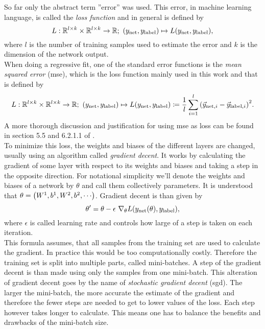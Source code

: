 So far only the abstract term ''error'' was used. This error, in machine learning language, is called the \emph{loss function} and in general is defined by
\begin{equation}\label{def:general_loss}
L:\mathbb{R}^{l\times k}\times\mathbb{R}^{l\times k}\to\mathbb{R};\ (y_\text{net}, y_\text{label})\mapsto L(y_\text{net}, y_\text{label}),
\end{equation}
where $l$ is the number of training samples used to estimate the error and $k$ is the dimension of the network output.\\
When doing a regressive fit, one of the standard error functions is the \emph{mean squared error} (\gls{mse}), which is the loss function mainly used in this work and that is defined by
\begin{equation}\label{def:loss_mean_squared_error}
L:\mathbb{R}^{l\times k}\times\mathbb{R}^{l\times k}\to\mathbb{R};\ (y_\text{net}, y_\text{label})\mapsto L(y_\text{net}, y_\text{label})\coloneqq\frac{1}{l}\sum_{i=1}^l{(\vec{y}_{\text{net},i}-\vec{y}_{\text{label},i})}^2.
\end{equation}
A more thorough discussion and justification for using \gls{mse} as loss can be found in section 5.5 and 6.2.1.1 of \cite{deep_learning_book}.\\
To minimize this loss, the weights and biases of the different layers are changed, usually using an algorithm called \emph{gradient decent}. It works by calculating the gradient of some layer with respect to its weights and biases and taking a step in the opposite direction. For notational simplicity we'll denote the weights and biases of a network by $\theta$ and call them collectively parameters. It is understood that $\theta=\lr{W^{1},b^1, W^2, b^2, \cdots}$. Gradient decent is than given by
\begin{equation}\label{def:gradient_decent}
\theta '=\theta - \epsilon\ \nabla_\theta L{\left( y_\text{net}(\theta), y_\text{label} \right)},
\end{equation}
where $\epsilon$ is called learning rate and controls how large of a step is taken on each iteration.\\
This formula assumes, that all samples from the training set are used to calculate the gradient. In practice this would be too computationally costly. Therefore the training set is split into multiple parts, called mini-batches. A step of the gradient decent is than made using only the samples from one mini-batch. This alteration of gradient decent goes by the name of \emph{stochastic gradient decent} (\gls{sgd}). The larger the mini-batch, the more accurate the estimate of the gradient and therefore the fewer steps are needed to get to lower values of the loss. Each step however takes longer to calculate. This means one has to balance the benefits and drawbacks of the mini-batch size.\medskip\\
